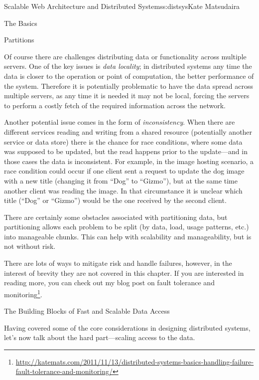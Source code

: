 \begin{aosachapter}{Scalable Web Architecture and Distributed Systems}{s:distsys}{Kate Matsudaira}
\begin{aosasect1}{The Basics}
\begin{aosasect2}{Partitions}

Of course there are challenges distributing data or functionality
across multiple servers. One of the key issues is \emph{data
  locality}; in distributed systems any time the data is closer to the
operation or point of computation, the better performance of the
system. Therefore it is potentially problematic to have the data
spread across multiple servers, as any time it is needed it may not be
local, forcing the servers to perform a costly fetch of the required
information across the network.

Another potential issue comes in the form of
\emph{inconsistency}. When there are different services reading and
writing from a shared resource (potentially another service or data
store) there is the chance for race conditions, where some data was
supposed to be updated, but the read happens prior to the update---and
in those cases the data is inconsistent. For example, in the image
hosting scenario, a race condition could occur if one client sent a
request to update the dog image with a new title (changing it from
``Dog'' to ``Gizmo''), but at the same time another client was reading
the image. In that circumstance it is unclear which title (``Dog'' or
``Gizmo'') would be the one received by the second client.

There are certainly some obstacles associated with partitioning data,
but partitioning allows each problem to be split (by data, load, usage
patterns, etc.) into manageable chunks. This can help with scalability
and manageability, but is not without risk.

There are lots of ways to mitigate risk and handle failures, however,
in the interest of brevity they are not covered in this chapter. If
you are interested in reading more, you can check out my blog post
on fault tolerance and monitoring\footnote{\url{http://katemats.com/2011/11/13/distributed-systems-basics-handling-failure-fault-tolerance-and-monitoring/}}.

\end{aosasect2}

\end{aosasect1}

\begin{aosasect1}{The Building Blocks of Fast and Scalable Data Access}

Having covered some of the core considerations in designing
distributed systems, let's now talk about the hard part---scaling
access to the data.


\end{aosasect1}
\end{aosachapter}
